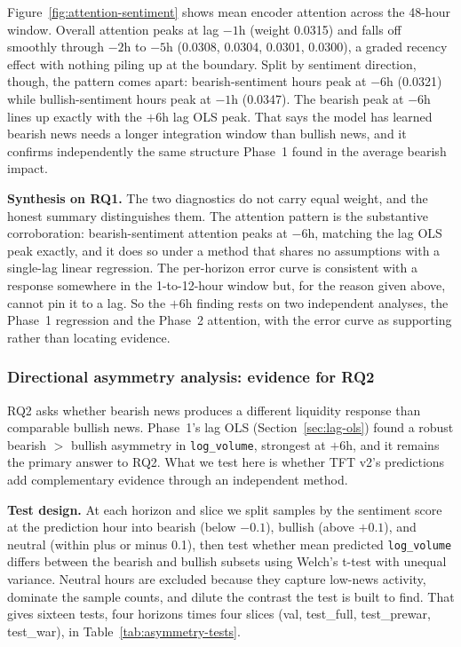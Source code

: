 Figure~\ref{fig:attention-sentiment} shows mean encoder attention across the 48-hour window. Overall attention peaks at lag $-1$h (weight 0.0315) and falls off smoothly through $-2$h to $-5$h (0.0308, 0.0304, 0.0301, 0.0300), a graded recency effect with nothing piling up at the boundary. Split by sentiment direction, though, the pattern comes apart: bearish-sentiment hours peak at $-6$h (0.0321) while bullish-sentiment hours peak at $-1$h (0.0347). The bearish peak at $-6$h lines up exactly with the $+6$h lag OLS peak. That says the model has learned bearish news needs a longer integration window than bullish news, and it confirms independently the same structure Phase~1 found in the average bearish impact.

\textbf{Synthesis on RQ1.} The two diagnostics do not carry equal weight, and the honest summary distinguishes them. The attention pattern is the substantive corroboration: bearish-sentiment attention peaks at $-6$h, matching the lag OLS peak exactly, and it does so under a method that shares no assumptions with a single-lag linear regression. The per-horizon error curve is consistent with a response somewhere in the 1-to-12-hour window but, for the reason given above, cannot pin it to a lag. So the $+6$h finding rests on two independent analyses, the Phase~1 regression and the Phase~2 attention, with the error curve as supporting rather than locating evidence.

\subsubsection{Directional asymmetry analysis: evidence for RQ2}\label{sec:asymmetry}

RQ2 asks whether bearish news produces a different liquidity response than comparable bullish news. Phase~1's lag OLS (Section~\ref{sec:lag-ols}) found a robust bearish $>$ bullish asymmetry in \texttt{log\_volume}, strongest at $+6$h, and it remains the primary answer to RQ2. What we test here is whether TFT v2's predictions add complementary evidence through an independent method.

\textbf{Test design.} At each horizon and slice we split samples by the sentiment score at the prediction hour into bearish (below $-0.1$), bullish (above $+0.1$), and neutral (within plus or minus 0.1), then test whether mean predicted \texttt{log\_volume} differs between the bearish and bullish subsets using Welch's t-test with unequal variance. Neutral hours are excluded because they capture low-news activity, dominate the sample counts, and dilute the contrast the test is built to find. That gives sixteen tests, four horizons times four slices (val, test\_full, test\_prewar, test\_war), in Table~\ref{tab:asymmetry-tests}.

